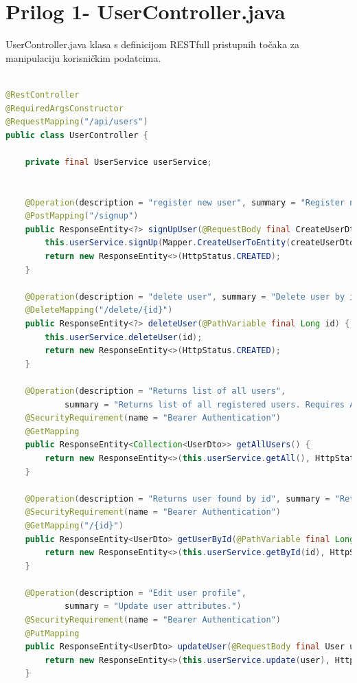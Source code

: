 \documentclass[a4paper,12pt,oneside]{article}
\begin{document}
\newpage
\section*{Prilog 1- UserController.java}
\label{prilog 1}
UserController.java klasa s definicijom RESTfull pristupnih točaka za manipulaciju korisničkim podatcima.

\begin{lstlisting}[language=Java]

@RestController
@RequiredArgsConstructor
@RequestMapping("/api/users")
public class UserController {

    private final UserService userService;


    @Operation(description = "register new user", summary = "Register new user with provided attributes.")
    @PostMapping("/signup")
    public ResponseEntity<?> signUpUser(@RequestBody final CreateUserDto createUserDto) {
        this.userService.signUp(Mapper.CreateUserToEntity(createUserDto));
        return new ResponseEntity<>(HttpStatus.CREATED);
    }

    @Operation(description = "delete user", summary = "Delete user by id.")
    @DeleteMapping("/delete/{id}")
    public ResponseEntity<?> deleteUser(@PathVariable final Long id) {
        this.userService.deleteUser(id);
        return new ResponseEntity<>(HttpStatus.CREATED);
    }

    @Operation(description = "Returns list of all users",
            summary = "Returns list of all registered users. Requires Admin rights")
    @SecurityRequirement(name = "Bearer Authentication")
    @GetMapping
    public ResponseEntity<Collection<UserDto>> getAllUsers() {
        return new ResponseEntity<>(this.userService.getAll(), HttpStatus.OK);
    }

    @Operation(description = "Returns user found by id", summary = "Returns user found by id.")
    @SecurityRequirement(name = "Bearer Authentication")
    @GetMapping("/{id}")
    public ResponseEntity<UserDto> getUserById(@PathVariable final Long id) {
        return new ResponseEntity<>(this.userService.getById(id), HttpStatus.OK);
    }

    @Operation(description = "Edit user profile",
            summary = "Update user attributes.")
    @SecurityRequirement(name = "Bearer Authentication")
    @PutMapping
    public ResponseEntity<UserDto> updateUser(@RequestBody final User user) {
        return new ResponseEntity<>(this.userService.update(user), HttpStatus.OK);
    }


\end{lstlisting}
\end{document}
